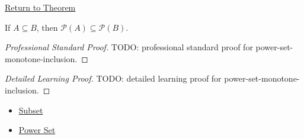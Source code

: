 \newpage
{}
\label{prf:power-set-monotone-inclusion}

\begin{remark*}[Return]
\hyperref[thm:power-set-monotone-inclusion]{Return to Theorem}
\end{remark*}

\begin{theorem*}
If $A\subseteq B$, then $\mathcal{P}(A)\subseteq\mathcal{P}(B)$.
\end{theorem*}

\begin{proof}[Professional Standard Proof]
\LRAProofBodyStart
TODO: professional standard proof for power-set-monotone-inclusion.
\end{proof}

\begin{proof}[Detailed Learning Proof]
\LRAProofBodyStart
TODO: detailed learning proof for power-set-monotone-inclusion.
\end{proof}

\begin{remark*}
\end{remark*}

\begin{dependencies}
\begin{itemize}
  \item \hyperref[def:subset]{Subset}
  \item \hyperref[def:power-set]{Power Set}
\end{itemize}
\end{dependencies}

\clearpage
